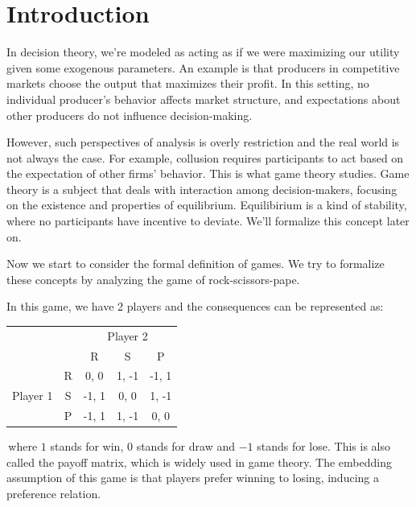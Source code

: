 \chapter{Introduction}
In decision theory, we're modeled as acting as if we were maximizing our utility given some exogenous parameters. 
An example is that producers in competitive markets choose the output that maximizes their profit. In this setting, no individual producer's behavior affects market structure, and expectations about other producers do not influence decision-making.

However, such perspectives of analysis is overly restriction and the real world is not always the case. For example, collusion requires 
participants to act based on the expectation of other firms' behavior. This is what game theory studies. Game theory is a subject 
that deals with interaction among decision-makers, focusing on the existence and properties of equilibrium. Equilibirium is a kind of stability, where 
no participants have incentive to deviate. We'll formalize this concept later on.

Now we start to consider the formal definition of games. We try to formalize these concepts by analyzing the game of rock-scissors-pape.
\begin{example}
    In this game, we have 2 players and the consequences can be represented as:

\begin{table}[h]
\centering
\begin{tabular}{ccccc}
                          &                        & \multicolumn{3}{c}{Player 2}                                                         \\
                          &                        & R                          & S                          & P                          \\ \cline{3-5} 
\multirow{3}{*}{Player 1} & \multicolumn{1}{c|}{R} & \multicolumn{1}{c|}{0, 0}  & \multicolumn{1}{c|}{1, -1} & \multicolumn{1}{c|}{-1, 1} \\ \cline{3-5} 
                          & \multicolumn{1}{c|}{S} & \multicolumn{1}{c|}{-1, 1} & \multicolumn{1}{c|}{0, 0}  & \multicolumn{1}{c|}{1, -1} \\ \cline{3-5} 
                          & \multicolumn{1}{c|}{P} & \multicolumn{1}{c|}{-1, 1} & \multicolumn{1}{c|}{1, -1} & \multicolumn{1}{c|}{0, 0}  \\ \cline{3-5} 
\end{tabular}
\end{table}

    \,where $1$ stands for win, $0$ stands for draw and $-1$ stands for lose. This is also called the payoff matrix, which is widely used in game theory. The embedding assumption of this game is that players prefer winning to losing, inducing a preference relation.
\end{example}

